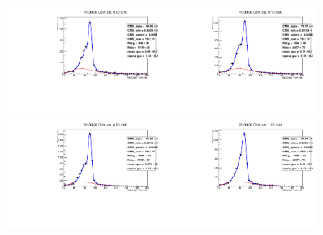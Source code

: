 \begin{figure}[htb]
  \begin{center}
   \includegraphics[width=0.45\textwidth]{../figs/figs_v11/ELECTRON_WGamma/EtoGammaFits/sa_hZmass_h_Data_EtoGamma_Enr_BARREL_pt30to35_ieta0_noWMtCut.pdf}\includegraphics[width=0.45\textwidth]{../figs/figs_v11/ELECTRON_WGamma/EtoGammaFits/sa_hZmass_h_Data_EtoGamma_Enr_BARREL_pt30to35_ieta1_noWMtCut.pdf}\\
   \includegraphics[width=0.45\textwidth]{../figs/figs_v11/ELECTRON_WGamma/EtoGammaFits/sa_hZmass_h_Data_EtoGamma_Enr_BARREL_pt30to35_ieta2_noWMtCut.pdf}\includegraphics[width=0.45\textwidth]{../figs/figs_v11/ELECTRON_WGamma/EtoGammaFits/sa_hZmass_h_Data_EtoGamma_Enr_BARREL_pt30to35_ieta3_noWMtCut.pdf}\\

\end{center}
\end{figure}
